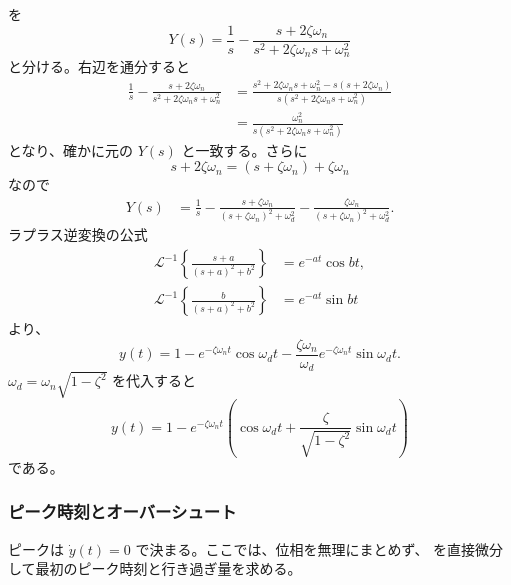 \begin{derivation}
 を
\begin{equation}
  Y(s)=\frac{1}{s}-
  \frac{s+2\zeta\omega_n}{s^2+2\zeta\omega_n s+\omega_n^2}
\end{equation}
と分ける。右辺を通分すると
\begin{align}
  \frac{1}{s}-\frac{s+2\zeta\omega_n}{s^2+2\zeta\omega_n s+\omega_n^2}
  &=\frac{s^2+2\zeta\omega_n s+\omega_n^2-s(s+2\zeta\omega_n)}{s(s^2+2\zeta\omega_n s+\omega_n^2)}\\
  &=\frac{\omega_n^2}{s(s^2+2\zeta\omega_n s+\omega_n^2)}
\end{align}
となり、確かに元の $Y(s)$ と一致する。さらに
\begin{equation}
  s+2\zeta\omega_n=(s+\zeta\omega_n)+\zeta\omega_n
\end{equation}
なので
\begin{align}
  Y(s)
  &=\frac{1}{s}-
  \frac{s+\zeta\omega_n}{(s+\zeta\omega_n)^2+
  \omega_d^2}
  -\frac{\zeta\omega_n}{(s+\zeta\omega_n)^2+
  \omega_d^2}.
\end{align}
ラプラス逆変換の公式
\begin{align}
  \mathcal{L}^{-1}\left\{\frac{s+a}{(s+a)^2+b^2}\right\}&=e^{-at}\cos bt,\\
  \mathcal{L}^{-1}\left\{\frac{b}{(s+a)^2+b^2}\right\}&=e^{-at}\sin bt
\end{align}
より、
\begin{equation}
  y(t)=1-e^{-\zeta\omega_n t}\cos\omega_d t
  -\frac{\zeta\omega_n}{\omega_d}e^{-\zeta\omega_n t}\sin\omega_d t.
\end{equation}
$\omega_d=\omega_n\sqrt{1-\zeta^2}$ を代入すると
\begin{equation}
  y(t)=1-e^{-\zeta\omega_n t}
  \left(\cos\omega_d t+\frac{\zeta}{\sqrt{1-\zeta^2}}\sin\omega_d t\right)
  \label{eq:underdamped-step-response}
\end{equation}
である。
\end{derivation}

\subsubsection{ピーク時刻とオーバーシュート}

ピークは $\dot{y}(t)=0$ で決まる。ここでは、位相を無理にまとめず、 を直接微分して最初のピーク時刻と行き過ぎ量を求める。

